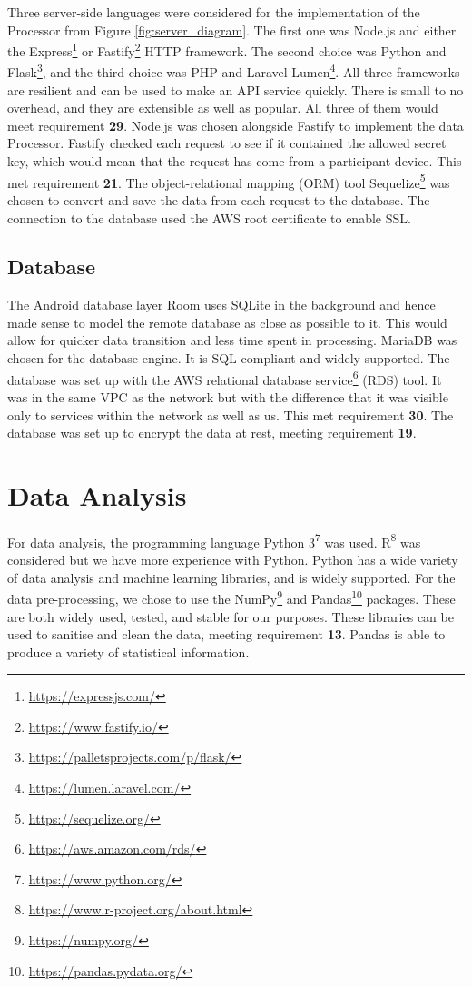 \documentclass{l4proj}
\begin{document}
Three server-side languages were considered for the implementation of the Processor from Figure \ref{fig:server_diagram}. The first one was Node.js and either the Express\footnote{\url{https://expressjs.com/}} or Fastify\footnote{\url{https://www.fastify.io/}} HTTP framework. The second choice was Python and Flask\footnote{\url{https://palletsprojects.com/p/flask/}}, and the third choice was PHP and Laravel Lumen\footnote{\url{https://lumen.laravel.com/}}. All three frameworks are resilient and can be used to make an API service quickly. There is small to no overhead, and they are extensible as well as popular. All three of them would meet requirement \textbf{29}. Node.js was chosen alongside Fastify to implement the data Processor. Fastify checked each request to see if it contained the allowed secret key, which would mean that the request has come from a participant device. This met requirement \textbf{21}. The object-relational mapping (ORM) tool Sequelize\footnote{\url{https://sequelize.org/}} was chosen to convert and save the data from each request to the database. The connection to the database used the AWS root certificate to enable SSL.

\subsection{Database}
The Android database layer Room uses SQLite in the background and hence made sense to model the remote database as close as possible to it. This would allow for quicker data transition and less time spent in processing. MariaDB was chosen for the database engine. It is SQL compliant and widely supported. The database was set up with the AWS relational database service\footnote{\url{https://aws.amazon.com/rds/}} (RDS) tool. It was in the same VPC as the network but with the difference that it was visible only to services within the network as well as us. This met requirement \textbf{30}. The database was set up to encrypt the data at rest, meeting requirement \textbf{19}.

\section{Data Analysis}
For data analysis, the programming language Python 3\footnote{\url{https://www.python.org/}} was used. R\footnote{\url{https://www.r-project.org/about.html}} was considered but we have more experience with Python. Python has a wide variety of data analysis and machine learning libraries, and is widely supported. For the data pre-processing, we chose to use the NumPy\footnote{\url{https://numpy.org/}} and Pandas\footnote{\url{https://pandas.pydata.org/}} packages. These are both widely used, tested, and stable for our purposes. These libraries can be used to sanitise and clean the data, meeting requirement \textbf{13}. Pandas is able to produce a variety of statistical information.
\end{document}
